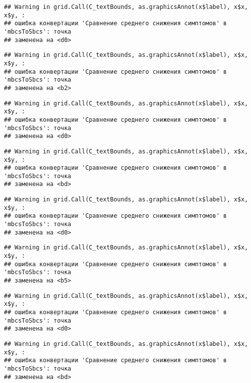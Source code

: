 \documentclass[
]{article}
\begin{document}
\begin{verbatim}
## Warning in grid.Call(C_textBounds, as.graphicsAnnot(x$label), x$x, x$y, :
## ошибка конвертации 'Сравнение среднего снижения симптомов' в 'mbcsToSbcs': точка
## заменена на <d0>
\end{verbatim}

\begin{verbatim}
## Warning in grid.Call(C_textBounds, as.graphicsAnnot(x$label), x$x, x$y, :
## ошибка конвертации 'Сравнение среднего снижения симптомов' в 'mbcsToSbcs': точка
## заменена на <b2>
\end{verbatim}

\begin{verbatim}
## Warning in grid.Call(C_textBounds, as.graphicsAnnot(x$label), x$x, x$y, :
## ошибка конвертации 'Сравнение среднего снижения симптомов' в 'mbcsToSbcs': точка
## заменена на <d0>
\end{verbatim}

\begin{verbatim}
## Warning in grid.Call(C_textBounds, as.graphicsAnnot(x$label), x$x, x$y, :
## ошибка конвертации 'Сравнение среднего снижения симптомов' в 'mbcsToSbcs': точка
## заменена на <bd>
\end{verbatim}

\begin{verbatim}
## Warning in grid.Call(C_textBounds, as.graphicsAnnot(x$label), x$x, x$y, :
## ошибка конвертации 'Сравнение среднего снижения симптомов' в 'mbcsToSbcs': точка
## заменена на <d0>
\end{verbatim}

\begin{verbatim}
## Warning in grid.Call(C_textBounds, as.graphicsAnnot(x$label), x$x, x$y, :
## ошибка конвертации 'Сравнение среднего снижения симптомов' в 'mbcsToSbcs': точка
## заменена на <b5>
\end{verbatim}

\begin{verbatim}
## Warning in grid.Call(C_textBounds, as.graphicsAnnot(x$label), x$x, x$y, :
## ошибка конвертации 'Сравнение среднего снижения симптомов' в 'mbcsToSbcs': точка
## заменена на <d0>
\end{verbatim}

\begin{verbatim}
## Warning in grid.Call(C_textBounds, as.graphicsAnnot(x$label), x$x, x$y, :
## ошибка конвертации 'Сравнение среднего снижения симптомов' в 'mbcsToSbcs': точка
## заменена на <bd>
\end{verbatim}
\end{document}
